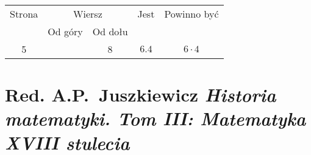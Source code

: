 \documentclass[a4paper,11pt]{article}
\numberwithin{equation}{section}
\begin{document}
\begin{center}

  \begin{tabular}{|c|c|c|c|c|}
    \hline
    Strona & \multicolumn{2}{c|}{Wiersz} & Jest
    & Powinno być \\ \cline{2-3}
    & Od góry & Od dołu & & \\
    \hline
    5  & &  8 & $6.4$ & $6 \cdot 4$ \\
    \hline
  \end{tabular}

\end{center}

\VerSpaceTwo











\newpage

\section{Red. A.P.~Juszkiewicz
  \textit{Historia matematyki. Tom III: Matematyka XVIII stulecia}
  \parencite{Red-Juszkiewicz-Historia-matematyki-Vol-III-Pub-1977}}















\end{document}

